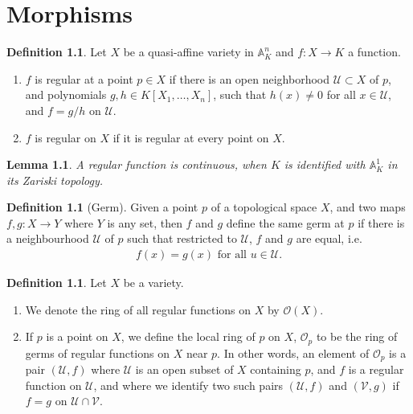 \documentclass[11pt]{book}
\newtheorem{lemma}[theorem]{Lemma}
\theoremstyle{definition}
\newtheorem{definition}[theorem]{Definition}
\numberwithin{equation}{section}
\begin{document}
\chapter{Morphisms}

\begin{defbox}
    \begin{definition}
        Let \(X\) be a quasi-affine variety in \(\mathbb{A}^n_K\) and \(f: X \rightarrow K\) a function.
        \begin{enumerate}
            \item \(f\) is regular at a point \(p \in X\) if there is an open neighborhood \(\mathcal{U} \subset X\) of \(p\), and polynomials \(g, h \in K[X_1, \ldots, X_n]\), such that \(h(x) \neq 0\) for all \(x \in \mathcal{U}\), and \(f = g/h\) on \(\mathcal{U}\).
            \item \(f\) is regular on \(X\) if it is regular at every point on \(X\).
        \end{enumerate}
    \end{definition}
\end{defbox}
\begin{thmbox}
    \begin{lemma}
        A regular function is continuous, when \(K\) is identified with \(\mathbb{A}^1_K\) in its Zariski topology.
    \end{lemma}
\end{thmbox}
\begin{defbox}
    \begin{definition}[Germ]
        Given a point \(p\) of a topological space \(X\), and two maps \(f, g: X \rightarrow Y\) where \(Y\) is any set, then \(f\) and \(g\) define the same germ at \(p\) if there is a neighbourhood \(\mathcal{U}\) of \(p\) such that restricted to \(\mathcal{U}\), \(f\) and \(g\) are equal, i.e.
        \begin{align*}
            f(x) = g(x) \text{ for all } u \in \mathcal{U} \text{.}
        \end{align*}
    \end{definition}
\end{defbox}
\begin{defbox}
    \begin{definition}
        Let \(X\) be a variety.
        \begin{enumerate}
            \item We denote the ring of all regular functions on \(X\) by \(\mathcal{O}(X)\).
            \item If \(p\) is a point on \(X\), we define the local ring of \(p\) on \(X\), \(\mathcal{O}_p\) to be the ring of germs of regular functions on \(X\) near \(p\). In other words, an element of \(\mathcal{O}_p\) is a pair \((\mathcal{U}, f)\) where \(\mathcal{U}\) is an open subset of \(X\) containing \(p\), and \(f\) is a regular function on \(\mathcal{U}\), and where we identify two such pairs \((\mathcal{U}, f)\) and \((\mathcal{V}, g)\) if \(f = g\) on \(\mathcal{U} \cap \mathcal{V}\).
        \end{enumerate}
    \end{definition}
\end{defbox}
\end{document}
